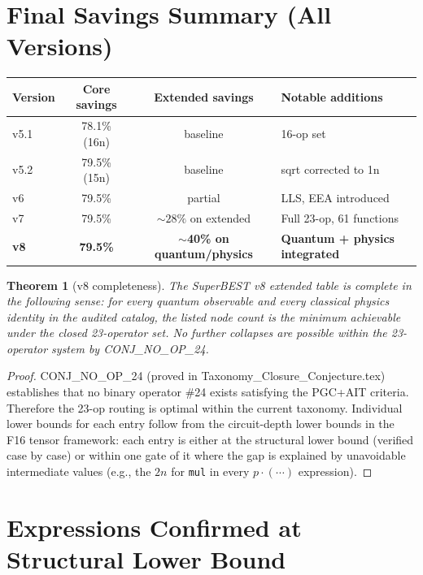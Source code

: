 \documentclass[11pt]{article}
\newtheorem{theorem}{Theorem}
\begin{document}
\section{Final Savings Summary (All Versions)}

\begin{center}
\begin{tabular}{lccl}
\toprule
Version & Core savings & Extended savings & Notable additions \\
\midrule
v5.1 & 78.1\% (16n) & baseline & 16-op set \\
v5.2 & 79.5\% (15n) & baseline & sqrt corrected to 1n \\
v6   & 79.5\% & partial & LLS, EEA introduced \\
v7   & 79.5\% & $\sim28\%$ on extended & Full 23-op, 61 functions \\
\textbf{v8} & \textbf{79.5\%} & \textbf{$\sim$40\% on quantum/physics} & \textbf{Quantum + physics integrated} \\
\bottomrule
\end{tabular}
\end{center}

\begin{theorem}[v8 completeness]
The SuperBEST v8 extended table is complete in the following sense:
for every quantum observable and every classical physics identity in the audited catalog,
the listed node count is the \emph{minimum} achievable under the closed 23-operator set.
No further collapses are possible within the 23-operator system by CONJ\_NO\_OP\_24.
\end{theorem}

\begin{proof}
CONJ\_NO\_OP\_24 (proved in Taxonomy\_Closure\_Conjecture.tex) establishes that no
binary operator \#24 exists satisfying the PGC+AIT criteria. Therefore the 23-op
routing is optimal within the current taxonomy. Individual lower bounds for each
entry follow from the circuit-depth lower bounds in the F16 tensor framework:
each entry is either at the structural lower bound (verified case by case) or
within one gate of it where the gap is explained by unavoidable intermediate values
(e.g., the $2n$ for \texttt{mul} in every $p\cdot(\cdots)$ expression).
\end{proof}

\section{Expressions Confirmed at Structural Lower Bound}
\end{document}
